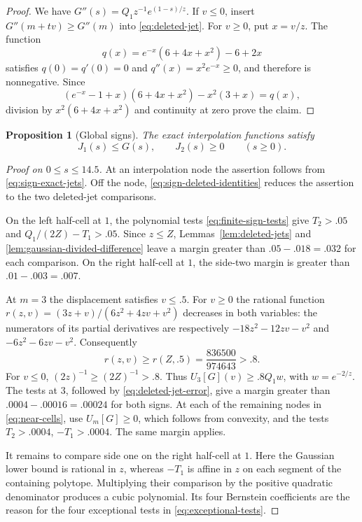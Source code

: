 \documentclass[11pt]{article}
\newtheorem{proposition}[theorem]{Proposition}
\theoremstyle{remark}\newtheorem{remark}[theorem]{Remark}
\begin{document}
\begin{proof}
We have $G''(s)=Q_1z^{-1}e^{(1-s)/z}$.  If $v\le0$, insert
$G''(m+tv)\ge G''(m)$ into \eqref{eq:deleted-jet}.
For $v\ge0$, put $x=v/z$.  The function
\[
 q(x)=e^{-x}(6+4x+x^2)-6+2x
\]
satisfies $q(0)=q'(0)=0$ and $q''(x)=x^2e^{-x}\ge0$, and
therefore is nonnegative.  Since
\[
 (e^{-x}-1+x)(6+4x+x^2)-x^2(3+x)=q(x),
\]
division by $x^2(6+4x+x^2)$ and continuity at zero prove the claim.
\end{proof}

\begin{proposition}[Global signs]\label{prop:global-signs}
The exact interpolation functions satisfy
\[
 J_1(s)\le G(s),\qquad J_2(s)\ge0\qquad(s\ge0).
\]
\end{proposition}

\begin{proof}[Proof on $0\le s\le14.5$]
At an interpolation node the assertion follows from
\eqref{eq:sign-exact-jets}. Off the node,
\eqref{eq:sign-deleted-identities} reduces the assertion to the two
deleted-jet comparisons.

On the left half-cell at $1$, the polynomial tests
\eqref{eq:finite-sign-tests} give
$T_2>.05$ and $Q_1/(2Z)-T_1>.05$.
Since $z\le Z$, Lemmas~\ref{lem:deleted-jets} and
\ref{lem:gaussian-divided-difference} leave a margin greater than
$.05-.018=.032$ for each comparison.  On the right half-cell at
$1$, the side-two margin is greater than $.01-.003=.007$.

At $m=3$ the displacement satisfies $v\le.5$.  For $v\ge0$ the
rational function
$r(z,v)=(3z+v)/(6z^2+4zv+v^2)$ decreases in both variables:
the numerators of its partial derivatives are respectively
$-18z^2-12zv-v^2$ and $-6z^2-6zv-v^2$.
Consequently
\[
 r(z,v)\ge r(Z,.5)=\frac{836500}{974643}>.8.
\]
For $v\le0$, $(2z)^{-1}\ge(2Z)^{-1}>.8$.  Thus
$U_3[G](v)\ge .8Q_1w$, with $w=e^{-2/z}$.
The tests at $3$, followed by \eqref{eq:deleted-jet-error}, give
a margin greater than $.0004-.00016=.00024$ for both signs.
At each of the remaining nodes in \eqref{eq:near-cells}, use
$U_m[G]\ge0$, which follows from convexity, and the tests
$T_2>.0004$, $-T_1>.0004$.  The same margin applies.

It remains to compare side one on the right half-cell at $1$.
Here the Gaussian lower bound is rational in $z$, whereas $-T_1$ is
affine in $z$ on each segment of the containing polytope. Multiplying
their comparison by the positive quadratic denominator produces a cubic
polynomial. Its four Bernstein coefficients are the reason for the four
exceptional tests in \eqref{eq:exceptional-tests}.


\end{proof}
\end{document}
